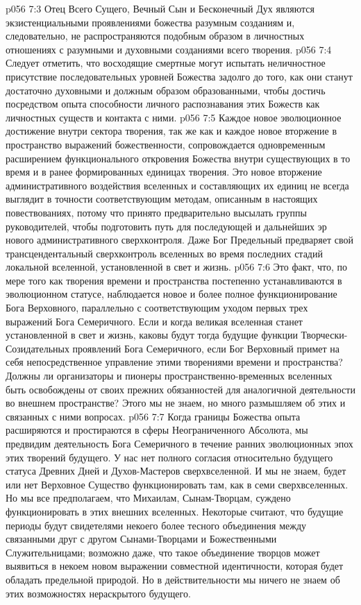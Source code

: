 \vs p056 7:3 \pc Отец Всего Сущего, Вечный Сын и Бесконечный Дух являются экзистенциальными проявлениями божества разумным созданиям и, следовательно, не распространяются подобным образом в личностных отношениях с разумными и духовными созданиями всего творения.
\vs p056 7:4 \pc Следует отметить, что восходящие смертные могут испытать неличностное присутствие последовательных уровней Божества задолго до того, как они станут достаточно духовными и должным образом образованными, чтобы достичь посредством опыта способности личного распознавания этих Божеств как личностных существ и контакта с ними.
\vs p056 7:5 Каждое новое эволюционное достижение внутри сектора творения, так же как и каждое новое вторжение в пространство выражений божественности, сопровождается одновременным расширением функционального откровения Божества внутри существующих в то время и в ранее формированных единицах творения. Это новое вторжение административного воздействия вселенных и составляющих их единиц не всегда выглядит в точности соответствующим методам, описанным в настоящих повествованиях, потому что принято предварительно высылать группы руководителей, чтобы подготовить путь для последующей и дальнейших эр нового административного сверхконтроля. Даже Бог Предельный предваряет свой трансцендентальный сверхконтроль вселенных во время последних стадий локальной вселенной, установленной в свет и жизнь.
\vs p056 7:6 Это факт, что, по мере того как творения времени и пространства постепенно устанавливаются в эволюционном статусе, наблюдается новое и более полное функционирование Бога Верховного, параллельно с соответствующим уходом первых трех выражений Бога Семеричного. Если и когда великая вселенная станет установленной в свет и жизнь, каковы будут тогда будущие функции Творчески\hyp{}Созидательных проявлений Бога Семеричного, если Бог Верховный примет на себя непосредственное управление этими творениями времени и пространства? Должны ли организаторы и пионеры пространственно\hyp{}временных вселенных быть освобождены от своих прежних обязанностей для аналогичной деятельности во внешнем пространстве? Этого мы не знаем, но много размышляем об этих и связанных с ними вопросах.
\vs p056 7:7 \pc Когда границы Божества опыта расширяются и простираются в сферы Неограниченного Абсолюта, мы предвидим деятельность Бога Семеричного в течение ранних эволюционных эпох этих творений будущего. У нас нет полного согласия относительно будущего статуса Древних Дней и Духов\hyp{}Мастеров сверхвселенной. И мы не знаем, будет или нет Верховное Существо функционировать там, как в семи сверхвселенных. Но мы все предполагаем, что Михаилам, Сынам\hyp{}Творцам, суждено функционировать в этих внешних вселенных. Некоторые считают, что будущие периоды будут свидетелями некоего более тесного объединения между связанными друг с другом Сынами\hyp{}Творцами и Божественными Служительницами; возможно даже, что такое объединение творцов может выявиться в некоем новом выражении совместной идентичности, которая будет обладать предельной природой. Но в действительности мы ничего не знаем об этих возможностях нераскрытого будущего.
